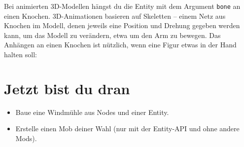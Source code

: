 Bei animierten 3D-Modellen hängst du die Entity mit dem Argument
\texttt{bone} an einen Knochen. 3D-Animationen basieren auf Skeletten --
einem Netz aus Knochen im Modell, denen jeweils eine Position und
Drehung gegeben werden kann, um das Modell zu verändern, etwa um den Arm
zu bewegen. Das Anhängen an einen Knochen ist nützlich, wenn eine Figur
etwas in der Hand halten soll:

\begin{Shaded}
\begin{Highlighting}[]
\OperatorTok{:}\OperatorTok{(}\OperatorTok{,}
    \OperatorTok{,}           
    \OperatorTok{\{}\OperatorTok{=}\OperatorTok{,} \OperatorTok{=}\OperatorTok{,} \OperatorTok{=}\OperatorTok{\},}   
    \OperatorTok{\{}\OperatorTok{={-}}\OperatorTok{,} \OperatorTok{=}\OperatorTok{,} \OperatorTok{=}\OperatorTok{\})} 
\end{Highlighting}
\end{Shaded}

\section{Jetzt bist du dran}\label{jetzt-bist-du-dran}

\begin{itemize}
\tightlist
\item
  Baue eine Windmühle aus Nodes und einer Entity.
\item
  Erstelle einen Mob deiner Wahl (nur mit der Entity-API und ohne andere
  Mods).
\end{itemize}
